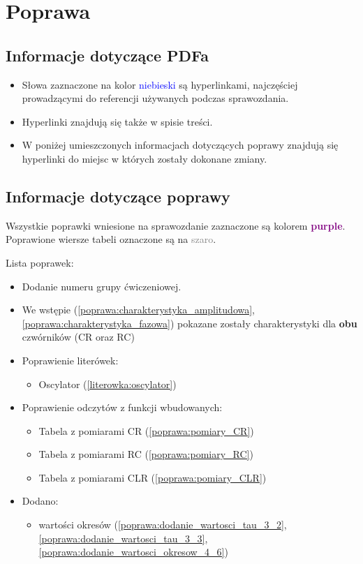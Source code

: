\chapter{Poprawa}

\section{Informacje dotyczące PDFa}

\begin{itemize}
    \item Słowa zaznaczone na kolor \textcolor{blue}{niebieski} są hyperlinkami, najczęściej prowadzącymi do referencji używanych podczas sprawozdania.
    \item Hyperlinki znajdują się także w spisie treści.
    \item W poniżej umieszczonych informacjach dotyczących poprawy znajdują się hyperlinki do miejsc w których zostały dokonane zmiany.
\end{itemize}

\section{Informacje dotyczące poprawy}

Wszystkie poprawki wniesione na sprawozdanie zaznaczone są kolorem \textcolor{purple}{\textbf{purple}}. \\
Poprawione wiersze tabeli oznaczone są na \textcolor{gray}{szaro}.

Lista poprawek:
\begin{itemize}
    \item Dodanie numeru grupy ćwiczeniowej.
    \item We wstępie (\ref{poprawa:charakterystyka_amplitudowa}, \ref{poprawa:charakterystyka_fazowa}) pokazane zostały charakterystyki dla \textbf{obu} czwórników (CR oraz RC)
    \item Poprawienie literówek:
        \begin{itemize}
            \item Oscylator (\ref{literowka:oscylator})
        \end{itemize}
    \item Poprawienie odczytów z funkcji wbudowanych:
        \begin{itemize}
            \item Tabela z pomiarami CR (\ref{poprawa:pomiary_CR})
            \item Tabela z pomiarami RC (\ref{poprawa:pomiary_RC})
            \item Tabela z pomiarami CLR (\ref{poprawa:pomiary_CLR})
        \end{itemize}
    \item Dodano:
        \begin{itemize}
            \item wartości okresów (\ref{poprawa:dodanie_wartosci_tau_3_2}, \ref{poprawa:dodanie_wartosci_tau_3_3}, \ref{poprawa:dodanie_wartosci_okresow_4_6})
        \end{itemize}
\end{itemize}